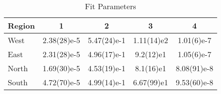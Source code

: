 {\renewcommand{\arraystretch}{1.3}
\begin{table}[htbp]
\centering
\caption{Fit Parameters}
\begin{tabular}{l S S S S}
\toprule
  Region &         1 &        2 &        3 &         4 \\
\midrule
 West & 2.38(28)e-5 & 5.47(24)e-1 & 1.11(14)e2 &  1.01(6)e-7 \\
 East & 2.31(28)e-5 & 4.96(17)e-1 &  9.2(12)e1 &  1.05(6)e-7 \\
North & 1.69(30)e-5 & 4.53(19)e-1 &  8.1(16)e1 & 8.08(91)e-8 \\
South & 4.72(70)e-5 & 4.99(14)e-1 & 6.67(99)e1 & 9.53(60)e-8 \\
\bottomrule
\end{tabular}
\end{table}
}